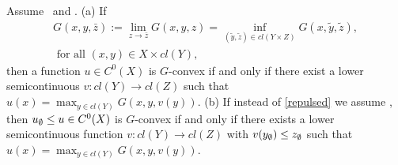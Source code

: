 					
\begin{proposition}\label{Prop:Gtransform}
	Assume \Gzero\ and \Gfour. {\rm (a)} If 
	\begin{equation}\label{repulsed}
	\begin{split}
		G(x,y,\bar{z}) := \lim_{z \to \bar z}G(x,y,z) = \inf_{(\tilde{y}, \tilde{z})\in cl(Y\times Z)} G(x, \tilde{y}, \tilde{z}), \\
		\text{ for all } (x,y)\in X\times cl(Y),
	\end{split}
	\end{equation} 
	then a function $u \in C^0(X)$ is $G$-convex if and only if there exist a lower semicontinuous 
	$v: cl(Y) \longrightarrow cl(Z)$ such that $u(x) = \max_{y\in cl(Y)} G(x,y,v(y))$.
	{\rm (b)} If instead of \eqref{repulsed} we assume \Gfive,
	then $u_{\emptyset} \le u \in C^0(X)$ is $G$-convex if and only if there exists a lower semicontinuous function $v: cl(Y) \longrightarrow cl(Z)$ with $v(y_{\emptyset}) \le z_{\emptyset}$ such that $u(x) = \max_{y\in cl(Y)} G(x,y,v(y))$.
\end{proposition}
						
